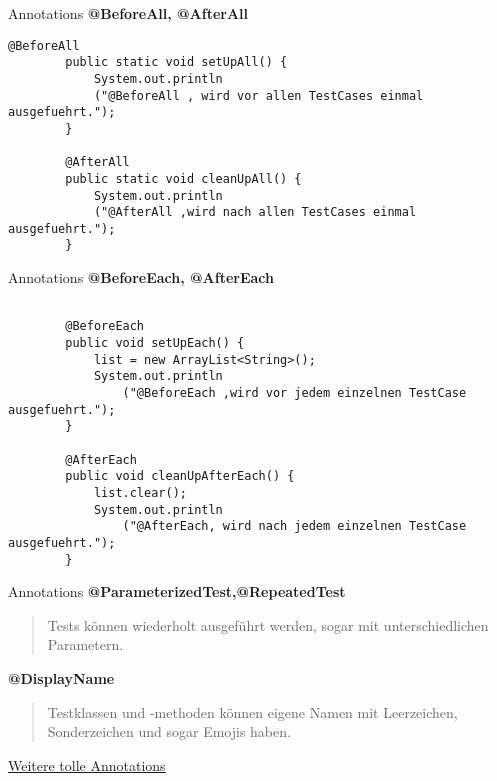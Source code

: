 \documentclass[10pt]{beamer}
\begin{document}
\begin{frame}[fragile]{Annotations}
     \textcolor{mygreen}{\textbf{@BeforeAll, @AfterAll}}
    \begin{lstlisting}[basicstyle=\ttfamily\scriptsize,gobble=8]
    	@BeforeAll		
    	public static void setUpAll() {							
            System.out.println
            ("@BeforeAll , wird vor allen TestCases einmal ausgefuehrt.");					
    	}

    	@AfterAll
    	public static void cleanUpAll() {							
            System.out.println
            ("@AfterAll ,wird nach allen TestCases einmal ausgefuehrt.");					
    	}		
    \end{lstlisting}
\end{frame}

\begin{frame}[fragile]{Annotations}
     \textcolor{mygreen}{\textbf{@BeforeEach, @AfterEach}}
    \begin{lstlisting}[basicstyle=\ttfamily\scriptsize,gobble=8]

    	@BeforeEach		
    	public void setUpEach() {					
        	list = new ArrayList<String>();					
        	System.out.println
                ("@BeforeEach ,wird vor jedem einzelnen TestCase ausgefuehrt.");					
    	}

    	@AfterEach
    	public void cleanUpAfterEach() {					
        	list.clear();			
        	System.out.println
                ("@AfterEach, wird nach jedem einzelnen TestCase ausgefuehrt.");					
    	}				
    \end{lstlisting}
\end{frame}

\begin{frame}[fragile]{Annotations}
    \textcolor{mygreen}{\textbf{@ParameterizedTest,@RepeatedTest}}
    
    \begin{quote}
    Tests können wiederholt ausgeführt werden, sogar mit unterschiedlichen Parametern.
    \end{quote}
    \textcolor{mygreen}{\textbf{@DisplayName}}

    \begin{quote}
    Testklassen und -methoden können eigene Namen mit Leerzeichen, Sonderzeichen und sogar Emojis haben.
    \end{quote}

    \href{https://dzone.com/articles/junit-5-annotations-with-examples-1}{Weitere tolle Annotations}\\
\end{frame}
\end{document}
